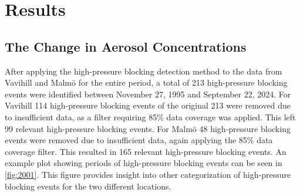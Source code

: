 \newpage
\section{Results}
\subsection{The Change in Aerosol Concentrations}
After applying the high-pressure blocking detection method to the data from Vavihill and Malmö for the entire period, a total of 213 high-pressure blocking events were identified between November 27, 1995 and September 22, 2024. For Vavihill 114 high-pressure blocking events of the original 213 were removed due to insufficient \PM data, as a filter requiring 85\% data coverage was applied. This left 99 relevant high-pressure blocking events. For Malmö 48 high-pressure blocking events were removed due to insufficient \PM data, again applying the 85\% data coverage filter. This resulted in 165 relevant high-pressure blocking events. An example plot showing periods of high-pressure blocking events can be seen in \autoref{fig:2001}. This figure provides insight into other categorization of high-pressure blocking events for the two different locations.  

